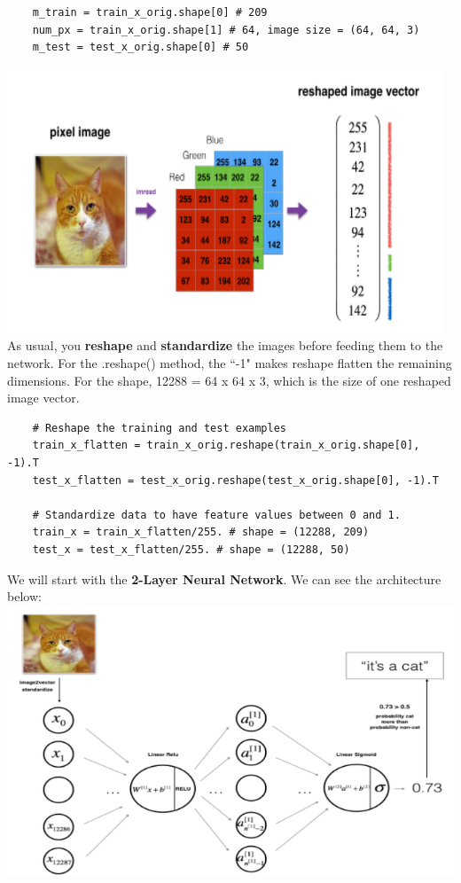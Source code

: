 \documentclass[11pt, a4paper]{article}
\begin{document}
\begin{spacing}{1.1}
\begin{lstlisting}
	m_train = train_x_orig.shape[0] # 209
	num_px = train_x_orig.shape[1] # 64, image size = (64, 64, 3)
	m_test = test_x_orig.shape[0] # 50 \end{lstlisting} \vspace*{1mm} 
	\hspace*{35mm} \includegraphics[scale=.7]{cat_stand} \\
	As usual, you \textbf{reshape} and \textbf{standardize} the images before feeding them to the network. For the .reshape() method, the ``-1" makes reshape flatten the remaining dimensions. For the shape, 12288 = 64 x 64 x 3, which is the size of one reshaped image vector.
	\begin{lstlisting}
	# Reshape the training and test examples 
	train_x_flatten = train_x_orig.reshape(train_x_orig.shape[0], -1).T
	test_x_flatten = test_x_orig.reshape(test_x_orig.shape[0], -1).T
	
	# Standardize data to have feature values between 0 and 1.
	train_x = train_x_flatten/255. # shape = (12288, 209)
	test_x = test_x_flatten/255. # shape = (12288, 50)	\end{lstlisting} \vspace*{1mm} 
	We will start with the \textbf{2-Layer Neural Network}. We can see the architecture below: \\	
	\hspace*{30mm} \includegraphics[scale=.6]{two_layer_cat} \newpage


\end{spacing}
\end{document}
